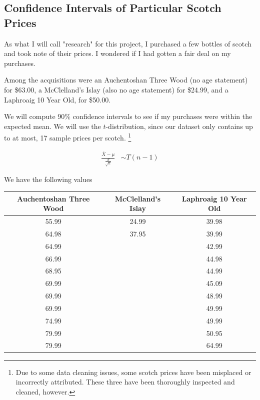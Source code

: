 \pagebreak

\subsection{Confidence Intervals of Particular Scotch Prices}

As what I will call "research" for this project, I purchased a few bottles of scotch and took note of their prices. I wondered if I had gotten a fair deal on my purchases.

Among the acquisitions were an Auchentoshan Three Wood (no age statement) for \$63.00, a McClelland's Islay (also no age statement) for \$24.99, and a Laphroaig 10 Year Old, for \$50.00. 

We will compute 90\% confidence intervals to see if my purchases were within the expected mean. We will use the $t$-distribution, since our dataset only contains up to at most, 17 sample prices per scotch. \footnote{Due to some data cleaning issues, some scotch prices have been misplaced or incorrectly attributed. These three have been thoroughly inspected and cleaned, however.}

\begin{equation*}
\begin{split}
     \frac{\overline{X} - \mu}{\frac{S}{\sqrt{n}}} &\sim T(n - 1)
\end{split}
\end{equation*}

We have the following values


\begin{center}
\begin{tabular}{ c c c }
    Auchentoshan Three Wood & McClelland's Islay & Laphroaig 10 Year Old \\
    \hline
    \hline
    55.99 & 24.99 & 39.98 \\ 
    64.98 & 37.95 & 39.99 \\
    64.99 &       & 42.99 \\
    66.99 &       & 44.98 \\
    68.95 &       & 44.99 \\
    69.99 &       & 45.09 \\
    69.99 &       & 48.99 \\
    69.99 &       & 49.99 \\
    74.99 &       & 49.99 \\
    79.99 &       & 50.95 \\
    79.99 &       & 64.99 \\
\end{tabular}
\end{center}

